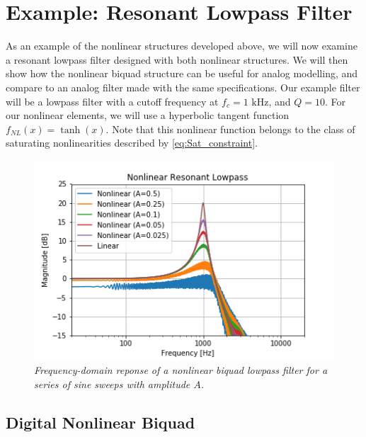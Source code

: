 \documentclass[twoside,a4paper]{article}
\begin{document}
\section{Example: Resonant Lowpass Filter}
%
As an example of the nonlinear structures developed above,
we will now examine a resonant lowpass filter
designed with both nonlinear structures. We will then show how the
nonlinear biquad structure can be useful for analog modelling,
and compare to an analog filter made with the same specifications.
\newline\newline
Our example filter will be a lowpass filter with a cutoff frequency
at $f_c = 1\text{ kHz}$, and $Q=10$. For our nonlinear elements, we
will use a hyperbolic tangent function $f_{NL}(x) = \tanh (x)$.
Note that this nonlinear function belongs to the class of
saturating nonlinearities described by \cref{eq:Sat_constraint}.
%
\begin{figure}[h]
    \center
    \includegraphics[width=\linewidth]{../Pics/NL-LPF.png}
    \caption{\label{NL-LPF-freq}{\it Frequency-domain reponse of a nonlinear biquad
                                     lowpass filter for a series of sine sweeps with
                                     amplitude $A$.}}
\end{figure}
%

\subsection{Digital Nonlinear Biquad}
\end{document}
